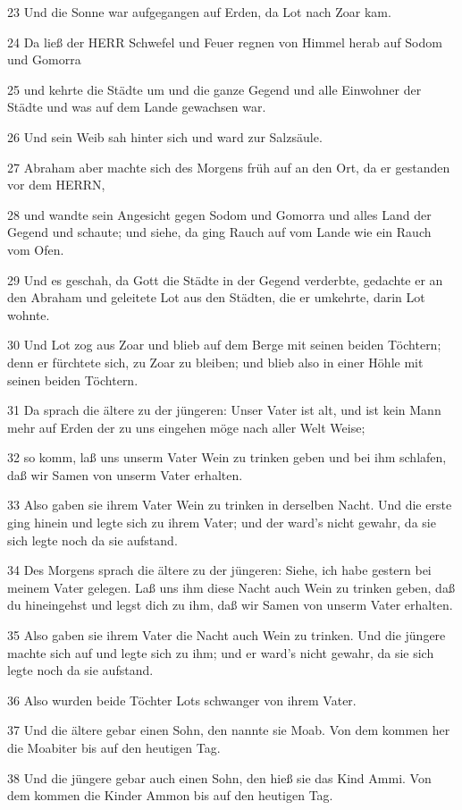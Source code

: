 \par 23 Und die Sonne war aufgegangen auf Erden, da Lot nach Zoar kam.
\par 24 Da ließ der HERR Schwefel und Feuer regnen von Himmel herab auf Sodom und Gomorra
\par 25 und kehrte die Städte um und die ganze Gegend und alle Einwohner der Städte und was auf dem Lande gewachsen war.
\par 26 Und sein Weib sah hinter sich und ward zur Salzsäule.
\par 27 Abraham aber machte sich des Morgens früh auf an den Ort, da er gestanden vor dem HERRN,
\par 28 und wandte sein Angesicht gegen Sodom und Gomorra und alles Land der Gegend und schaute; und siehe, da ging Rauch auf vom Lande wie ein Rauch vom Ofen.
\par 29 Und es geschah, da Gott die Städte in der Gegend verderbte, gedachte er an den Abraham und geleitete Lot aus den Städten, die er umkehrte, darin Lot wohnte.
\par 30 Und Lot zog aus Zoar und blieb auf dem Berge mit seinen beiden Töchtern; denn er fürchtete sich, zu Zoar zu bleiben; und blieb also in einer Höhle mit seinen beiden Töchtern.
\par 31 Da sprach die ältere zu der jüngeren: Unser Vater ist alt, und ist kein Mann mehr auf Erden der zu uns eingehen möge nach aller Welt Weise;
\par 32 so komm, laß uns unserm Vater Wein zu trinken geben und bei ihm schlafen, daß wir Samen von unserm Vater erhalten.
\par 33 Also gaben sie ihrem Vater Wein zu trinken in derselben Nacht. Und die erste ging hinein und legte sich zu ihrem Vater; und der ward's nicht gewahr, da sie sich legte noch da sie aufstand.
\par 34 Des Morgens sprach die ältere zu der jüngeren: Siehe, ich habe gestern bei meinem Vater gelegen. Laß uns ihm diese Nacht auch Wein zu trinken geben, daß du hineingehst und legst dich zu ihm, daß wir Samen von unserm Vater erhalten.
\par 35 Also gaben sie ihrem Vater die Nacht auch Wein zu trinken. Und die jüngere machte sich auf und legte sich zu ihm; und er ward's nicht gewahr, da sie sich legte noch da sie aufstand.
\par 36 Also wurden beide Töchter Lots schwanger von ihrem Vater.
\par 37 Und die ältere gebar einen Sohn, den nannte sie Moab. Von dem kommen her die Moabiter bis auf den heutigen Tag.
\par 38 Und die jüngere gebar auch einen Sohn, den hieß sie das Kind Ammi. Von dem kommen die Kinder Ammon bis auf den heutigen Tag.

